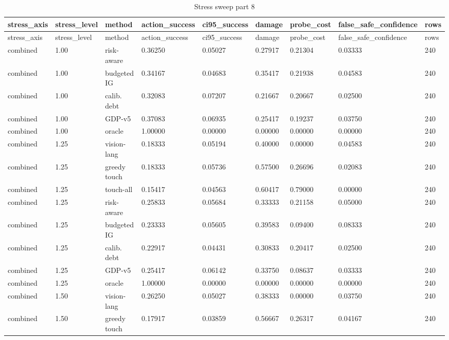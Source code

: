 \documentclass{article}
\begin{document}
\begin{center}
\tiny
\renewcommand{\arraystretch}{0.92}
\setlength{\tabcolsep}{3pt}
\begin{longtable}{lllllllll}
\caption{Stress sweep part 8}\label{tab:stress-sweep-8}\\
\toprule
stress\_axis & stress\_level & method & action\_success & ci95\_success & damage & probe\_cost & false\_safe\_confidence & rows \\
\midrule
\endfirsthead
\toprule
stress\_axis & stress\_level & method & action\_success & ci95\_success & damage & probe\_cost & false\_safe\_confidence & rows \\
\midrule
\endhead
combined & 1.00 & risk-aware & 0.36250 & 0.05027 & 0.27917 & 0.21304 & 0.03333 & 240 \\
combined & 1.00 & budgeted IG & 0.34167 & 0.04683 & 0.35417 & 0.21938 & 0.04583 & 240 \\
combined & 1.00 & calib. debt & 0.32083 & 0.07207 & 0.21667 & 0.20667 & 0.02500 & 240 \\
combined & 1.00 & GDP-v5 & 0.37083 & 0.06935 & 0.25417 & 0.19237 & 0.03750 & 240 \\
combined & 1.00 & oracle & 1.00000 & 0.00000 & 0.00000 & 0.00000 & 0.00000 & 240 \\
combined & 1.25 & vision-lang & 0.18333 & 0.05194 & 0.40000 & 0.00000 & 0.04583 & 240 \\
combined & 1.25 & greedy touch & 0.18333 & 0.05736 & 0.57500 & 0.26696 & 0.02083 & 240 \\
combined & 1.25 & touch-all & 0.15417 & 0.04563 & 0.60417 & 0.79000 & 0.00000 & 240 \\
combined & 1.25 & risk-aware & 0.25833 & 0.05684 & 0.33333 & 0.21158 & 0.05000 & 240 \\
combined & 1.25 & budgeted IG & 0.23333 & 0.05605 & 0.39583 & 0.09400 & 0.08333 & 240 \\
combined & 1.25 & calib. debt & 0.22917 & 0.04431 & 0.30833 & 0.20417 & 0.02500 & 240 \\
combined & 1.25 & GDP-v5 & 0.25417 & 0.06142 & 0.33750 & 0.08637 & 0.03333 & 240 \\
combined & 1.25 & oracle & 1.00000 & 0.00000 & 0.00000 & 0.00000 & 0.00000 & 240 \\
combined & 1.50 & vision-lang & 0.26250 & 0.05027 & 0.38333 & 0.00000 & 0.03750 & 240 \\
combined & 1.50 & greedy touch & 0.17917 & 0.03859 & 0.56667 & 0.26317 & 0.04167 & 240 \\

\end{longtable}
\end{center}
\end{document}
